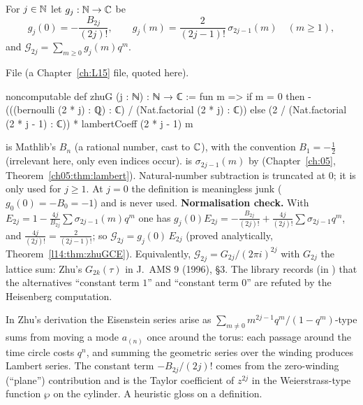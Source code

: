 \begin{definition}\label{l14:def:zhuG}
For $j\in{\mathbb{N}}$ let $g_j:{\mathbb{N}}\to{\mathbb{C}}$ be
\begin{equation*}
  g_j(0) = -\frac{B_{2j}}{(2j)!},\qquad g_j(m) = \frac{2}{(2j-1)!}\,\sigma_{2j-1}(m)\quad(m\ge1),
\end{equation*}
and $\mathcal G_{2j} = \sum_{m\ge0}g_j(m)q^m$.
\end{definition}
\noindent File  (a Chapter~\ref{ch:L15} file, quoted here).
\begin{leancode}
noncomputable def zhuG (j : ℕ) : ℕ → ℂ :=
  fun m =>
    if m = 0 then -(((bernoulli (2 * j) : ℚ) : ℂ) / (Nat.factorial (2 * j) : ℂ))
    else (2 / (Nat.factorial (2 * j - 1) : ℂ)) * lambertCoeff (2 * j - 1) m
\end{leancode}
\begin{dictionary}
 is Mathlib's $B_n$ (a rational number, cast to ${\mathbb{C}}$), with the convention $B_1 = -\tfrac12$ (irrelevant
here, only even indices occur).  is $\sigma_{2j-1}(m)$ by 
(Chapter~\ref{ch:05}, Theorem~\ref{ch05:thm:lambert}). Natural-number subtraction  is truncated at $0$; it
is only used for $j\ge1$. At $j=0$ the definition is meaningless junk ($g_0(0) = -B_0 = -1$) and is never used.
\textbf{Normalisation check.} With $E_{2j} = 1 - \frac{4j}{B_{2j}}\sum\sigma_{2j-1}(m)q^m$ one has
$g_j(0)E_{2j} = -\frac{B_{2j}}{(2j)!} + \frac{4j}{(2j)!}\sum\sigma_{2j-1}q^m$, and $\frac{4j}{(2j)!} =
\frac{2}{(2j-1)!}$; so $\mathcal G_{2j} = g_j(0)\,E_{2j}$ (proved analytically, Theorem~\ref{l14:thm:zhuGCE}). Equivalently,
$\mathcal G_{2j} = G_{2j}/(2\pi i)^{2j}$ with $G_{2j}$ the lattice sum: Zhu's $G_{2k}(\tau)$ in J.~AMS 9 (1996), §3. The library
records (in ) that the alternatives ``constant term $1$'' and ``constant term $0$'' are
refuted by the Heisenberg computation.
\end{dictionary}
\begin{physics}
In Zhu's derivation the Eisenstein series arise as $\sum_{m\neq0} m^{2j-1}q^m/(1-q^m)$-type sums from moving a mode
$a_{(n)}$ once around the torus: each passage around the time circle costs $q^{n}$, and summing the geometric series over
the winding produces Lambert series. The constant term $-B_{2j}/(2j)!$ comes from the zero-winding (``plane'') contribution
and is the Taylor coefficient of $z^{2j}$ in the Weierstrass-type function $\wp$ on the cylinder. A heuristic gloss on a
definition.
\end{physics}


